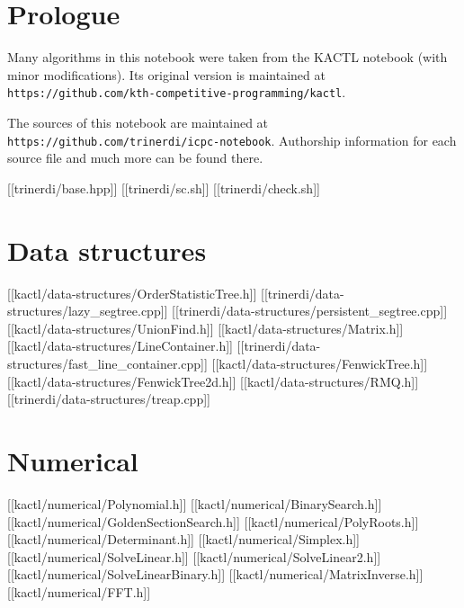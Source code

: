 

\dotoc

\chapter{Prologue}

Many algorithms in this notebook were taken from the KACTL notebook (with minor
modifications). Its original version is maintained at {\tt
https://github.com/kth-competitive-programming/kactl}.

The sources of this notebook are maintained at {\tt
https://github.com/trinerdi/icpc-notebook}. Authorship information for each
source file and much more can be found there.

[[trinerdi/base.hpp]]
[[trinerdi/sc.sh]]
[[trinerdi/check.sh]]



\chapter{Data structures}

[[kactl/data-structures/OrderStatisticTree.h]]
[[trinerdi/data-structures/lazy_segtree.cpp]]
[[trinerdi/data-structures/persistent_segtree.cpp]]
[[kactl/data-structures/UnionFind.h]]
[[kactl/data-structures/Matrix.h]]
[[kactl/data-structures/LineContainer.h]]
[[trinerdi/data-structures/fast_line_container.cpp]]
[[kactl/data-structures/FenwickTree.h]]
[[kactl/data-structures/FenwickTree2d.h]]
[[kactl/data-structures/RMQ.h]]
[[trinerdi/data-structures/treap.cpp]]

\chapter{Numerical}

[[kactl/numerical/Polynomial.h]]
[[kactl/numerical/BinarySearch.h]]
[[kactl/numerical/GoldenSectionSearch.h]]
[[kactl/numerical/PolyRoots.h]]
[[kactl/numerical/Determinant.h]]
[[kactl/numerical/Simplex.h]]
[[kactl/numerical/SolveLinear.h]]
[[kactl/numerical/SolveLinear2.h]]
[[kactl/numerical/SolveLinearBinary.h]]
[[kactl/numerical/MatrixInverse.h]]
[[kactl/numerical/FFT.h]]

